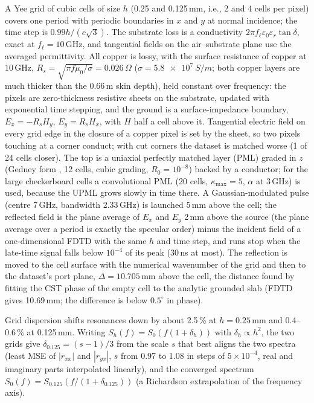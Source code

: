 \documentclass[journal]{IEEEtran}
\begin{document}
A Yee grid \cite{yee,taflove} of cubic cells of size $h$ (0.25 and 0.125\,mm, i.e., 2 and 4 cells per pixel) covers one period with periodic boundaries in $x$ and $y$ at normal incidence; the time step is $0.99h/(c\sqrt3)$. The substrate loss is a conductivity $2\pi f_{\ell}\varepsilon_0\varepsilon_r\tan\delta$, exact at $f_\ell=10$\,GHz, and tangential fields on the air--substrate plane use the averaged permittivity. All copper is lossy, with the surface resistance of copper at 10\,GHz, $R_s=\sqrt{\pi f\mu_0/\sigma}=0.026\,\Omega$ ($\sigma=\SI{5.8e7}{S/m}$; both copper layers are much thicker than the 0.66\,\textmu m skin depth), held constant over frequency: the pixels are zero-thickness resistive sheets on the substrate, updated with exponential time stepping, and the ground is a surface-impedance boundary, $E_x=-R_sH_y$, $E_y=R_sH_x$, with $H$ half a cell above it. Tangential electric field on every grid edge in the closure of a copper pixel is set by the sheet, so two pixels touching at a corner conduct; with cut corners the dataset is matched worse (1 of 24 cells closer). The top is a uniaxial perfectly matched layer (PML) graded in $z$ (Gedney form \cite{gedney}, 12 cells, cubic grading, $R_0=10^{-8}$) backed by a conductor; for the large checkerboard cells a convolutional PML \cite{roden} (20 cells, $\kappa_{\max}=5$, $\alpha$ at 3\,GHz) is used, because the UPML grows slowly in time there. A Gaussian-modulated pulse (centre 7\,GHz, bandwidth 2.33\,GHz) is launched 5\,mm above the cell; the reflected field is the plane average of $E_x$ and $E_y$ 2\,mm above the source (the plane average over a period is exactly the specular order) minus the incident field of a one-dimensional FDTD with the same $h$ and time step, and runs stop when the late-time signal falls below $10^{-4}$ of its peak (30\,ns at most). The reflection is moved to the cell surface with the numerical wavenumber of the grid and then to the dataset's port plane, $\Delta=10.705$\,mm above the cell, the distance found by fitting the CST phase of the empty cell to the analytic grounded slab \cite{pozar} (FDTD gives 10.69\,mm; the difference is below $0.5^\circ$ in phase).

Grid dispersion shifts resonances down by about 2.5\,\% at $h=0.25$\,mm and 0.4--0.6\,\% at 0.125\,mm. Writing $S_h(f)=S_0(f(1+\delta_h))$ with $\delta_h\propto h^2$, the two grids give $\delta_{0.125}=(s-1)/3$ from the scale $s$ that best aligns the two spectra (least MSE of $|r_{xx}|$ and $|r_{yx}|$, $s$ from 0.97 to 1.08 in steps of $5\times10^{-4}$, real and imaginary parts interpolated linearly), and the converged spectrum $S_0(f)=S_{0.125}(f/(1+\delta_{0.125}))$ (a Richardson extrapolation \cite{richardson} of the frequency axis).
\end{document}
